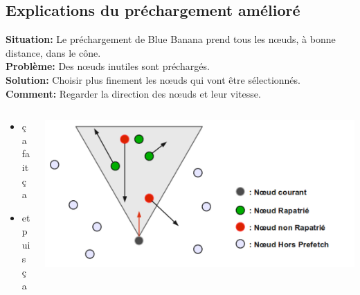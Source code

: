 \documentclass{beamer}
\begin{document}
  \subsection{Explications du préchargement amélioré}
  \begin{frame}
	\textbf{Situation:} Le préchargement de Blue Banana prend tous les nœuds, à bonne distance, dans le cône.\\
	\vspace{5mm}
	\textbf{Problème:} Des nœuds inutiles sont préchargés.\\
	\vspace{5mm}
	\textbf{Solution:} Choisir plus finement les nœuds qui vont être sélectionnés.\\
	\vspace{5mm}
	\textbf{Comment:} Regarder la direction des nœuds et leur vitesse.\\
  \end{frame}

  \begin{frame}
	\begin{columns}
         \begin{column}{5cm}
          \begin{itemize}
		\item ça fait ça
		\item et puis ça
	  \end{itemize}
	 \end{column}
         \begin{column}{6cm}
          \includegraphics[scale=0.11]{./Ressources/Images/prefetchaV1.png}\\
         \end{column}
        \end{columns}

  \end{frame}
	
\end{document}
